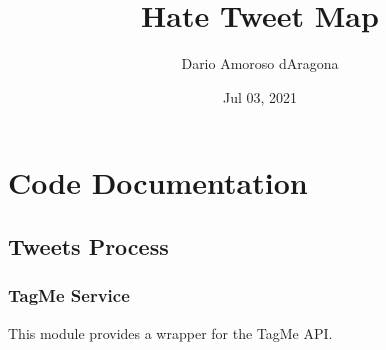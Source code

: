 \documentclass[letterpaper,10pt,english]{sphinxmanual}
\title{Hate Tweet Map}
\date{Jul 03, 2021}
\author{Dario Amoroso d\textquotesingle{}Aragona}
\begin{document}
\pagestyle{empty}
\sphinxmaketitle
\pagestyle{plain}
\sphinxtableofcontents
\pagestyle{normal}
\label{\detokenize{index::doc}}



\chapter{Code Documentation}
\label{\detokenize{code_comment/code_comment:code-documentation}}\label{\detokenize{code_comment/code_comment::doc}}

\section{Tweets Process}
\label{\detokenize{code_comment/tweet_processor:tweets-process}}\label{\detokenize{code_comment/tweet_processor::doc}}

\subsection{TagMe Service}
\label{\detokenize{code_comment/tweet_processor:module-hate_tweet_map.tweets_processor.MyTagMe}}\label{\detokenize{code_comment/tweet_processor:tagme-service}}
\sphinxAtStartPar
This module provides a wrapper for the TagMe API.
\end{document}
